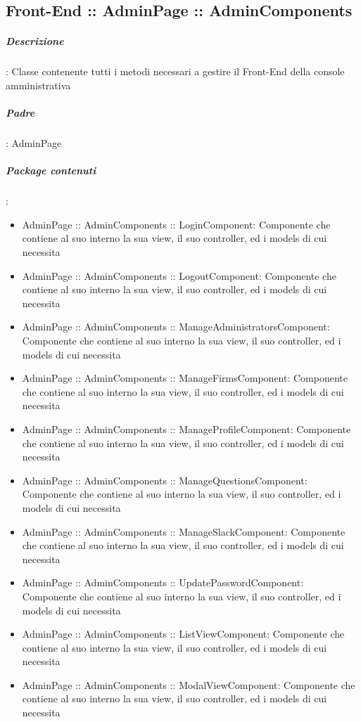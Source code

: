 \documentclass[../ManualeSviluppatore_v2.0.0.tex]{subfiles}
\begin{document}
	\subsection{Front-End :: AdminPage :: AdminComponents}

		\subparagraph{Descrizione}: Classe contenente tutti i metodi necessari a gestire il Front-End della console amministrativa
		\subparagraph{Padre}: AdminPage
		\subparagraph{Package contenuti}:
		\begin{itemize}
			\item AdminPage :: AdminComponents :: LoginComponent: Componente che contiene al suo interno la sua view, il suo controller, ed i models di cui necessita
			\item AdminPage :: AdminComponents :: LogoutComponent: Componente che contiene al suo interno la sua view, il suo controller, ed i models di cui necessita
			\item AdminPage :: AdminComponents :: ManageAdministratorsComponent: Componente che contiene al suo interno la sua view, il suo controller, ed i models di cui necessita
			\item AdminPage :: AdminComponents :: ManageFirmsComponent: Componente che contiene al suo interno la sua view, il suo controller, ed i models di cui necessita
			\item AdminPage :: AdminComponents :: ManageProfileComponent: Componente che contiene al suo interno la sua view, il suo controller, ed i models di cui necessita
			\item AdminPage :: AdminComponents :: ManageQuestionsComponent: Componente che contiene al suo interno la sua view, il suo controller, ed i models di cui necessita
			\item AdminPage :: AdminComponents :: ManageSlackComponent: Componente che contiene al suo interno la sua view, il suo controller, ed i models di cui necessita
			\item AdminPage :: AdminComponents :: UpdatePasswordComponent: Componente che contiene al suo interno la sua view, il suo controller, ed i models di cui necessita
			\item AdminPage :: AdminComponents :: ListViewComponent: Componente che contiene al suo interno la sua view, il suo controller, ed i models di cui necessita
			\item AdminPage :: AdminComponents :: ModalViewComponent: Componente che contiene al suo interno la sua view, il suo controller, ed i models di cui necessita
		\end{itemize}
\end{document}
